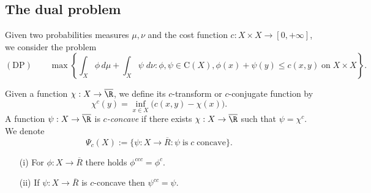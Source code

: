 \subsection{The dual problem}
\begin{defn} Given two probabilities measures $\mu, \nu$ and the cost function $c:X\times X\to [0,+\infty]$, we consider the problem
\begin{equation*}
    \mathrm{(DP)}\qquad
     \max \left\lbrace \int_X \phi\,d\mu + \int_X\psi\;d\nu: \phi,\psi\in \mathrm{C}(X), \phi(x)+\psi(y)\leq c(x,y)\;\text{on}\;X\times X \right\rbrace.
\end{equation*}
\end{defn}
\begin{defn} Given a function $\chi:X\to \overline{\R}$, we define its $c$-transform or $c$-conjugate function by
\begin{equation*}
    \chi^c(y) = \inf_{x\in X} \Big(c(x,y) - \chi(x)\Big).
\end{equation*}
A function $\psi:X\to \overline{\R}$ is \emph{$c$-concave} if there exists $\chi:X\to \overline{\R}$ such that $\psi=\chi^c$. We denote
\begin{equation*}
    \Psi_c(X):= \big\lbrace  \psi:X\to \overline{R}: \psi\;\text{is}\;c\;\text{concave}\big\rbrace.
\end{equation*}
\end{defn}

\begin{lem} \quad 
\begin{itemize}
    \item[(i)] For $\phi:X\to \overline{R}$ there holds $\phi^{ccc} = \phi^c$.
    \item[(ii)] If $\psi:X\to \overline{R}$ is $c$-concave then $\psi^{cc} = \psi$.
\end{itemize}
\end{lem}
